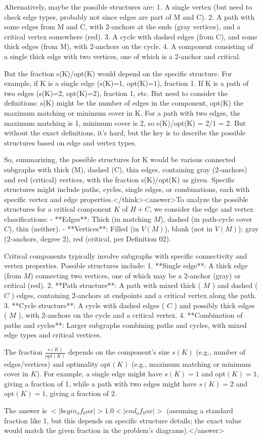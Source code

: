 Alternatively, maybe the possible structures are:
1. A single vertex (but need to check edge types, probably not since edges are part of M and C).
2. A path with some edges from M and C, with 2-anchors at the ends (gray vertices), and a critical vertex somewhere (red).
3. A cycle with dashed edges (from C), and some thick edges (from M), with 2-anchors on the cycle.
4. A component consisting of a single thick edge with two vertices, one of which is a 2-anchor and critical.

But the fraction s(K)/opt(K) would depend on the specific structure. For example, if K is a single edge (s(K)=1, opt(K)=1), fraction 1. If K is a path of two edges (s(K)=2, opt(K)=2), fraction 1, etc. But need to consider the definitions: s(K) might be the number of edges in the component, opt(K) the maximum matching or minimum cover in K. For a path with two edges, the maximum matching is 1, minimum cover is 2, so s(K)/opt(K) = 2/1 = 2. But without the exact definitions, it's hard, but the key is to describe the possible structures based on edge and vertex types.

So, summarizing, the possible structures for K would be various connected subgraphs with thick (M), dashed (C), thin edges, containing gray (2-anchors) and red (critical) vertices, with the fraction s(K)/opt(K) as given. Specific structures might include paths, cycles, single edges, or combinations, each with specific vertex and edge properties.</think><answer>To analyze the possible structures for a critical component \( K \) of \( H + C \), we consider the edge and vertex classifications:  
- **Edges**: Thick (in matching \( M \)), dashed (in path-cycle cover \( C \)), thin (neither).  
- **Vertices**: Filled (in \( V(M) \)), blank (not in \( V(M) \)); gray (2-anchors, degree 2), red (critical, per Definition 02).  

Critical components typically involve subgraphs with specific connectivity and vertex properties. Possible structures include:  
1. **Single edge**: A thick edge (from \( M \)) connecting two vertices, one of which may be a 2-anchor (gray) or critical (red).  
2. **Path structure**: A path with mixed thick ( \( M \) ) and dashed ( \( C \) ) edges, containing 2-anchors at endpoints and a critical vertex along the path.  
3. **Cycle structure**: A cycle with dashed edges ( \( C \) ) and possibly thick edges ( \( M \) ), with 2-anchors on the cycle and a critical vertex.  
4. **Combination of paths and cycles**: Larger subgraphs combining paths and cycles, with mixed edge types and critical vertices.  

The fraction \( \frac{s(K)}{\text{opt}(K)} \) depends on the component’s size \( s(K) \) (e.g., number of edges/vertices) and optimality \( \text{opt}(K) \) (e.g., maximum matching or minimum cover in \( K \)). For example, a single edge might have \( s(K) = 1 \) and \( \text{opt}(K) = 1 \), giving a fraction of 1, while a path with two edges might have \( s(K) = 2 \) and \( \text{opt}(K) = 1 \), giving a fraction of 2.  

The answer is \(<|begin_of_box|>1.0<|end_of_box|>\) (assuming a standard fraction like 1, but this depends on specific structure details; the exact value would match the given fraction in the problem’s diagrams).</answer>